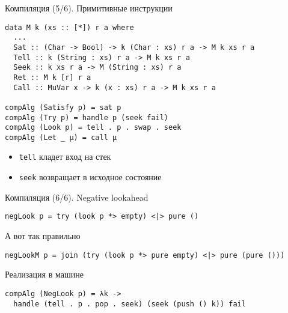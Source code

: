 \begin{frame}[fragile]{Компиляция (5/6). Примитивные инструкции}
\begin{verbatim}
data M k (xs :: [*]) r a where
  ...
  Sat :: (Char -> Bool) -> k (Char : xs) r a -> M k xs r a
  Tell :: k (String : xs) r a -> M k xs r a
  Seek :: k xs r a -> M (String : xs) r a
  Ret :: M k [r] r a
  Call :: MuVar x -> k (x : xs) r a -> M k xs r a

compAlg (Satisfy p) = sat p
compAlg (Try p) = handle p (seek fail)
compAlg (Look p) = tell . p . swap . seek
compAlg (Let _ μ) = call μ
\end{verbatim}
\newln 

\begin{itemize}
\item \texttt{tell} кладет вход на стек
\item \texttt{seek} возвращает в исходное состояние
\end{itemize}
\end{frame}

\begin{frame}[fragile]{Компиляция (6/6). Negative lookahead}
\begin{verbatim}
negLook p = try (look p *> empty) <|> pure ()

\end{verbatim}
\pause 
\newln 

А вот так правильно
\begin{verbatim}
negLookM p = join (try (look p *> pure empty) <|> pure (pure ()))
\end{verbatim}
\newln 

Реализация в машине
\begin{verbatim}
compAlg (NegLook p) = λk -> 
  handle (tell . p . pop . seek) (seek (push () k)) fail
\end{verbatim}
\end{frame}





